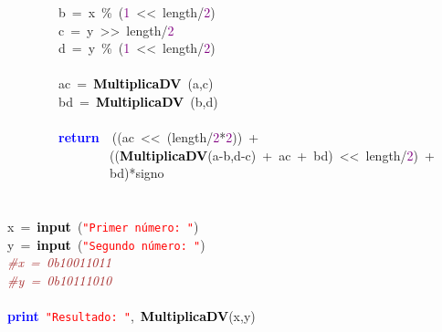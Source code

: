 \mbox{}\ \ \ \ \ \ \ \ b\ \textcolor{BrickRed}{=}\ x\ \textcolor{BrickRed}{\%}\ \textcolor{BrickRed}{(}\textcolor{Purple}{1}\ \textcolor{BrickRed}{\textless{}\textless{}}\ length\textcolor{BrickRed}{/}\textcolor{Purple}{2}\textcolor{BrickRed}{)} \\
\mbox{}\ \ \ \ \ \ \ \ c\ \textcolor{BrickRed}{=}\ y\ \textcolor{BrickRed}{\textgreater{}\textgreater{}}\ length\textcolor{BrickRed}{/}\textcolor{Purple}{2} \\
\mbox{}\ \ \ \ \ \ \ \ d\ \textcolor{BrickRed}{=}\ y\ \textcolor{BrickRed}{\%}\ \textcolor{BrickRed}{(}\textcolor{Purple}{1}\ \textcolor{BrickRed}{\textless{}\textless{}}\ length\textcolor{BrickRed}{/}\textcolor{Purple}{2}\textcolor{BrickRed}{)}\ \  \\
\mbox{} \\
\mbox{}\ \ \ \ \ \ \ \ ac\ \textcolor{BrickRed}{=}\ \textbf{\textcolor{Black}{MultiplicaDV}}\ \textcolor{BrickRed}{(}a\textcolor{BrickRed}{,}c\textcolor{BrickRed}{)} \\
\mbox{}\ \ \ \ \ \ \ \ bd\ \textcolor{BrickRed}{=}\ \textbf{\textcolor{Black}{MultiplicaDV}}\ \textcolor{BrickRed}{(}b\textcolor{BrickRed}{,}d\textcolor{BrickRed}{)} \\
\mbox{} \\
\mbox{}\ \ \ \ \ \ \ \ \textbf{\textcolor{Blue}{return}}\ \ \textcolor{BrickRed}{((}ac\ \textcolor{BrickRed}{\textless{}\textless{}}\ \textcolor{BrickRed}{(}length\textcolor{BrickRed}{/}\textcolor{Purple}{2}\textcolor{BrickRed}{*}\textcolor{Purple}{2}\textcolor{BrickRed}{))}\ \textcolor{BrickRed}{+}\  \\
\mbox{}\ \ \ \ \ \ \ \ \ \ \ \ \ \ \ \ \textcolor{BrickRed}{((}\textbf{\textcolor{Black}{MultiplicaDV}}\textcolor{BrickRed}{(}a\textcolor{BrickRed}{-}b\textcolor{BrickRed}{,}d\textcolor{BrickRed}{-}c\textcolor{BrickRed}{)}\ \textcolor{BrickRed}{+}\ ac\ \textcolor{BrickRed}{+}\ bd\textcolor{BrickRed}{)}\ \textcolor{BrickRed}{\textless{}\textless{}}\ length\textcolor{BrickRed}{/}\textcolor{Purple}{2}\textcolor{BrickRed}{)}\ \textcolor{BrickRed}{+} \\
\mbox{}\ \ \ \ \ \ \ \ \ \ \ \ \ \ \ \ bd\textcolor{BrickRed}{)*}signo \\
\mbox{}\ \ \ \  \\
\mbox{} \\
\mbox{}x\ \textcolor{BrickRed}{=}\ \textbf{\textcolor{Black}{input}}\ \textcolor{BrickRed}{(}\texttt{\textcolor{Red}{"{}Primer\ número:\ "{}}}\textcolor{BrickRed}{)} \\
\mbox{}y\ \textcolor{BrickRed}{=}\ \textbf{\textcolor{Black}{input}}\ \textcolor{BrickRed}{(}\texttt{\textcolor{Red}{"{}Segundo\ número:\ "{}}}\textcolor{BrickRed}{)} \\
\mbox{}\textit{\textcolor{Brown}{\#x\ =\ 0b10011011}} \\
\mbox{}\textit{\textcolor{Brown}{\#y\ =\ 0b10111010}} \\
\mbox{} \\
\mbox{}\textbf{\textcolor{Blue}{print}}\ \texttt{\textcolor{Red}{"{}Resultado:\ "{}}}\textcolor{BrickRed}{,}\ \textbf{\textcolor{Black}{MultiplicaDV}}\textcolor{BrickRed}{(}x\textcolor{BrickRed}{,}y\textcolor{BrickRed}{)}
